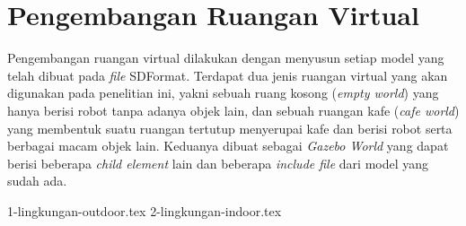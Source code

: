 \section{Pengembangan Ruangan Virtual}
\label{sec:lingkungansimulasi}

Pengembangan ruangan virtual dilakukan dengan menyusun setiap model yang telah dibuat pada \emph{file} SDFormat.
Terdapat dua jenis ruangan virtual yang akan digunakan pada penelitian ini,
  yakni sebuah ruang kosong (\emph{empty world}) yang hanya berisi robot tanpa adanya objek lain,
  dan sebuah ruangan kafe (\emph{cafe world}) yang membentuk suatu ruangan tertutup menyerupai kafe dan berisi robot serta berbagai macam objek lain.
Keduanya dibuat sebagai \emph{Gazebo World} yang dapat berisi beberapa \emph{child element} lain dan beberapa \emph{include file} dari model yang sudah ada.

{1-lingkungan-outdoor.tex}
{2-lingkungan-indoor.tex}
